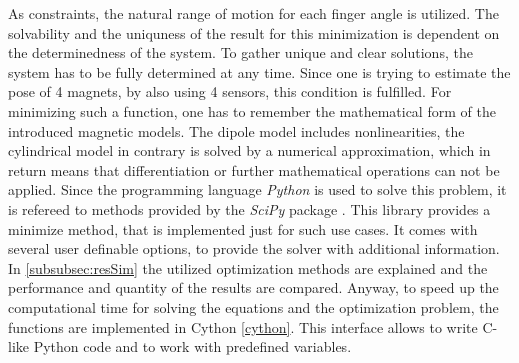 As constraints, the natural range of motion for each finger angle is utilized. The solvability and the uniquness of the result for this minimization is dependent on the determinedness of the system. To gather unique and clear solutions, the system has to be fully determined at any time. Since one is trying to estimate the pose of 4 magnets, by also using 4 sensors, this condition is fulfilled. For minimizing such a function, one has to remember the mathematical form of the introduced magnetic models. The dipole model includes nonlinearities, the cylindrical model in contrary is solved by a numerical approximation, which in return means that differentiation or further mathematical operations can not be applied. Since the programming language \emph{Python} \cite{python} is used to solve this problem, it is refereed to methods provided by the \emph{SciPy} \cite{scipy} package . This library provides a minimize method, that is implemented just for such use cases. It comes with several user definable options, to provide the solver with additional information. In \ref{subsubsec:resSim} the utilized optimization methods are explained and the performance and quantity of the results are compared. Anyway, to speed up the computational time for solving the equations and the optimization problem, the functions are implemented in Cython \ref{cython}. This interface allows to write C-like Python code and to work with predefined variables. 

